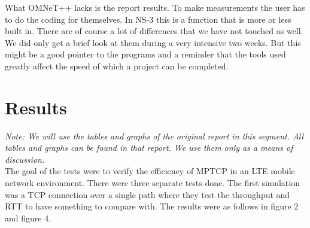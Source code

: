 \documentclass[11pt,twocolumn]{article}
\begin{document}
What OMNeT++ lacks is the report results. To make measurements the user has to do the coding for themselves. In NS-3 this is a function that is more or less built in. There are of course a lot of differences that we have not touched as well. We did only get a brief look at them during a very intensive two weeks. But this might be a good pointer to the programs and a reminder that the tools used greatly affect the speed of which a project can be completed.


\section{Results}

\emph{Note: We will use the tables and graphs of the original report\cite{MPTCP-LTE} in this segment. All tables and graphs can be found in that report. We use them only as a means of discussion.} \\

The goal of the tests were to verify the efficiency of MPTCP in an LTE mobile network environment. There were three separate tests done. The first simulation was a TCP connection over a single path where they test the throughput and RTT to have something to compare with. The results were as follows in figure 2 and figure 4.
\end{document}

